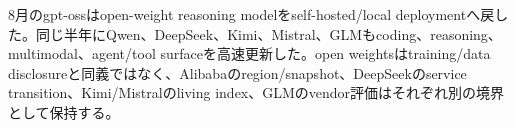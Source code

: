 
8月のgpt-ossはopen-weight reasoning modelをself-hosted/local deploymentへ戻した。同じ半年にQwen、DeepSeek、Kimi、Mistral、GLMもcoding、reasoning、multimodal、agent/tool surfaceを高速更新した。open weightsはtraining/data disclosureと同義ではなく、Alibabaのregion/snapshot、DeepSeekのservice transition、Kimi/Mistralのliving index、GLMのvendor評価はそれぞれ別の境界として保持する。\autocite{src-12865e8612c7,src-1c46fdf17c79,src-9156c37fb1c2,src-9191d43918fc,src-d8b7c1c36830,src-e547d0d8cbe3,src-eac8dfbeb78c}
